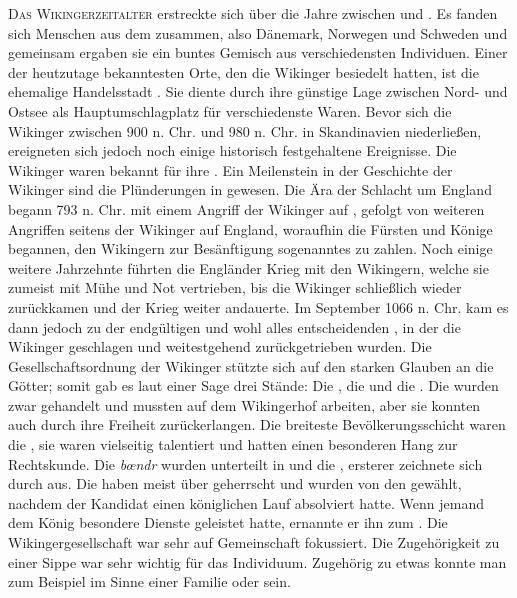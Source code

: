 \documentclass[12pt,a4paper,ngerman,openany]{book}
\newcommand{\flettrine}[2]{\lettrine[lines=2, depth=0, loversize=0.25, nindent=0.69pt, lraise=0.15]{\initfamily{#1}}{#2}}
\newcommand*\initfamily{\usefont{U}{GotIn}{xl}{n}}
\newlength{\diebox}
\newcommand{\luecke}[1]{\settowidth{\diebox}{#1}\raisebox{-1.0ex}{\parbox{2.7\diebox}{\dotfill}}}
\begin{document}
\flettrine{D}{Das Wikingerzeitalter} erstreckte sich über die Jahre zwischen \luecke{7.} und \luecke{10.}. Es fanden sich Menschen aus dem \luecke{skandi...} zusammen, also Dänemark, Norwegen und Schweden und gemeinsam ergaben sie ein buntes Gemisch aus verschiedensten Individuen. Einer der heutzutage bekanntesten Orte, den die Wikinger besiedelt hatten, ist die ehemalige Handelsstadt \luecke{Haithabu}. Sie diente durch ihre günstige Lage zwischen Nord- und Ostsee als Hauptumschlagplatz für verschiedenste Waren.
Bevor sich die Wikinger zwischen 900 n. Chr. und 980 n. Chr. in Skandinavien niederließen, ereigneten sich jedoch noch einige historisch festgehaltene Ereignisse. Die Wikinger waren bekannt für ihre \luecke{Raubzüge}. Ein Meilenstein in der Geschichte der Wikinger sind die Plünderungen in \luecke{England} gewesen. Die Ära der Schlacht um England begann 793 n. Chr. mit einem Angriff der Wikinger auf \luecke{das Kloster.}, gefolgt von weiteren Angriffen seitens der Wikinger auf England, woraufhin die Fürsten und Könige begannen, den Wikingern zur Besänftigung sogenanntes \luecke{Danegeld} zu zahlen. Noch einige weitere Jahrzehnte führten die Engländer Krieg mit den Wikingern, welche sie zumeist mit Mühe und Not vertrieben, bis die Wikinger schließlich wieder zurückkamen und der Krieg weiter andauerte. Im September 1066 n. Chr. kam es dann jedoch zu der endgültigen und wohl alles entscheidenden \luecke{Schlacht von.}, in der die Wikinger geschlagen und weitestgehend  zurückgetrieben wurden.
Die Gesellschaftsordnung der Wikinger stützte sich auf den starken Glauben an die Götter; somit gab es laut einer Sage drei Stände: Die \luecke{Sklaven}, die \luecke{Freien} und die \luecke{Jarls}.
Die \luecke{Sklaven} wurden zwar gehandelt und mussten auf dem Wikingerhof arbeiten, aber sie konnten auch durch \luecke{harte Arbe.} ihre Freiheit zurückerlangen.
Die breiteste Bevölkerungsschicht waren die \luecke{bondii}, sie waren vielseitig talentiert und hatten einen besonderen Hang zur Rechtskunde. Die \textit{bœndr} wurden unterteilt in \luecke{stórbœn} und die \luecke{smán..}, ersterer zeichnete sich durch \luecke{hohes Familiena...} aus. Die \luecke{Könige} haben meist über \luecke{eine kl..} geherrscht und wurden von den \luecke{stórbœndr} gewählt, nachdem der Kandidat einen königlichen Lauf absolviert hatte.
Wenn jemand dem König besondere Dienste geleistet hatte, ernannte er ihn zum \luecke{Jarl}.
Die Wikingergesellschaft war sehr auf Gemeinschaft fokussiert. Die Zugehörigkeit zu einer Sippe war sehr wichtig für das Individuum. Zugehörig zu etwas konnte man zum Beispiel im Sinne einer Familie oder \luecke{einer Blutsbrüderschaft} sein.
\end{document}
